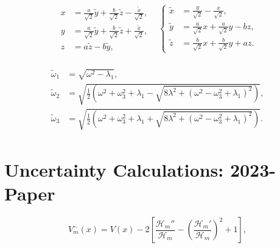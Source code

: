 \documentclass[12pt]{article}
\newcommand{\td}[1]{\tilde{#1}}
\begin{document}
\begin{align}\label{3D-xyz-V}
  \begin{split}
  \begin{aligned}
      x &= \frac{a}{\sqrt2}\td{y}+\frac{b}{\sqrt2} \td{z}-\frac{\td{x}}{\sqrt{2}}, \\
      y &= \frac{a}{\sqrt2} \td{y}+\frac{b}{\sqrt2}\td{z}+\frac{\td{x}}{\sqrt{2}},\\
      z &=a\td{z}-b\td{y}, 
  \end{aligned}
  & 
  \left\{
  \begin{aligned}
      \td{x} &= \frac{y}{\sqrt{2}}-\frac{x}{\sqrt{2}} , \\
      \td{y} &=\frac{a}{\sqrt2} x+\frac{a}{\sqrt2}y-bz , \\
      \td{z} &= \frac{b}{\sqrt2} x+\frac{b}{\sqrt2}y+az.
  \end{aligned}
  \right.
  \end{split}
\end{align}

\begin{align}
  \label{3D-omega'-V}
  \begin{split}
    \td{\omega}_1 &= \sqrt{\omega^2 -  \lambda_1}, \\
    \td{\omega}_2 &= \sqrt{\frac{1}{2}\left(\omega^2+\omega_3^2 +  \lambda_1 - \sqrt{8\lambda^2 + (\omega^2-\omega_3^2 +  \lambda_1)^2}\right)}, \\
    \td{\omega}_3 &= \sqrt{\frac{1}{2}\left(\omega^2+\omega_3^2 +  \lambda_1 + \sqrt{8\lambda^2 + (\omega^2-\omega_3^2 +  \lambda_1)^2}\right)}.
  \end{split}
\end{align}


\newpage



\section*{Uncertainty Calculations: 2023-Paper}


\begin{equation}
V^-_m(x)=V(x)-2\left[ \frac{\mathcal{H}_m''}{\mathcal{H}_m}-\left(\frac{\mathcal{H}_m'}{\mathcal{H}_m}\right)^2+1\right],
\end{equation} 
\end{document}
